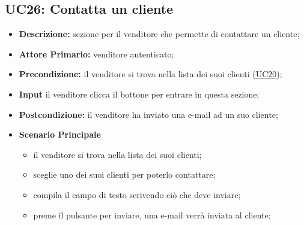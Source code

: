 \subsection{UC26: Contatta un cliente}
\label{sec:UC26}
\begin{itemize}
    \item \textbf{Descrizione:} sezione per il venditore che permette di contattare un cliente;
    \item \textbf{Attore Primario:} venditore autenticato;
    \item \textbf{Precondizione:} il venditore si trova nella lista dei suoi clienti (\hyperref[sec:UC20]{\underline{UC20}});
    \item \textbf{Input} il venditore clicca il bottone per entrare in questa sezione; 
    \item \textbf{Postcondizione:} il venditore ha inviato una e-mail ad un suo cliente;
    \item \textbf{Scenario Principale}
        \begin{itemize}
            \item il venditore si trova nella lista dei suoi clienti;
            \item sceglie uno dei suoi clienti per poterlo contattare;
            \item compila il campo di testo scrivendo ciò che deve inviare;
            \item preme il pulsante per inviare, una e-mail verrà inviata al cliente;
        \end{itemize}
\end{itemize}